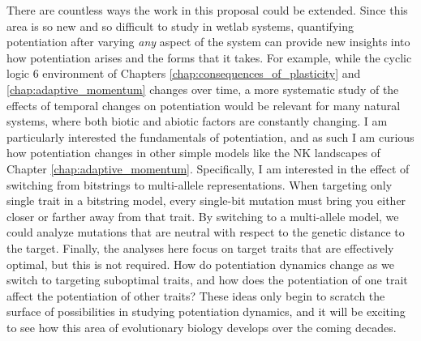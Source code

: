 There are countless ways the work in this proposal could be extended. 
Since this area is so new and so difficult to study in wetlab systems, quantifying potentiation after varying \textit{any} aspect of the system can provide new insights into how potentiation arises and the forms that it takes. 
For example, while the cyclic logic 6 environment of Chapters \ref{chap:consequences_of_plasticity} and \ref{chap:adaptive_momentum} changes over time, a more systematic study of the effects of temporal changes on potentiation would be relevant for many natural systems, where both biotic and abiotic factors are constantly changing. 
I am particularly interested the fundamentals of potentiation, and as such I am curious how potentiation changes in other simple models like the NK landscapes of Chapter \ref{chap:adaptive_momentum}.
Specifically, I am interested in the effect of switching from bitstrings to multi-allele representations. 
When targeting only single trait in a bitstring model, every single-bit mutation must bring you either closer or farther away from that trait. 
By switching to a multi-allele model, we could analyze mutations that are neutral with respect to the genetic distance to the target. 
Finally, the analyses here focus on target traits that are effectively optimal, but this is not required. 
How do potentiation dynamics change as we switch to targeting suboptimal traits, and how does the potentiation of one trait affect the potentiation of other traits?
These ideas only begin to scratch the surface of possibilities in studying potentiation dynamics, and it will be exciting to see how this area of evolutionary biology develops over the coming decades. 






